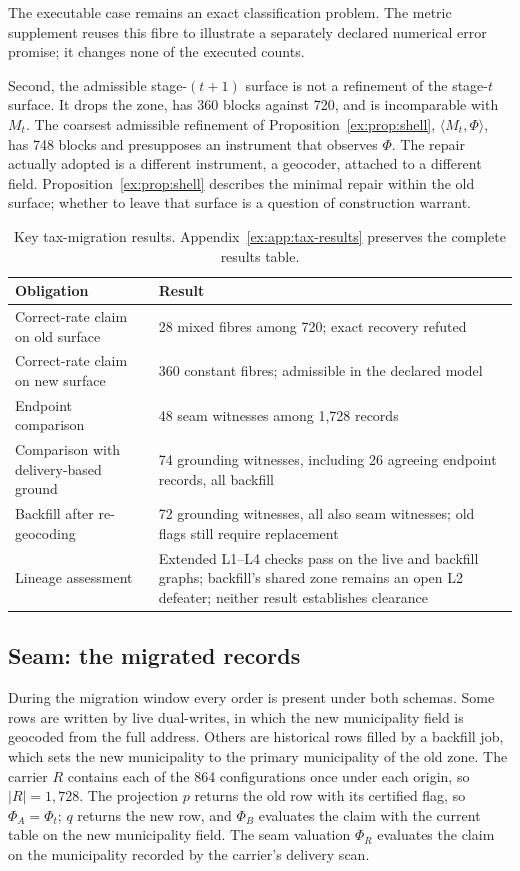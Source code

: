 \documentclass[11pt]{article}
\theoremstyle{definition}
\begin{document}
The executable case remains an exact classification problem. The metric supplement reuses this fibre to illustrate a separately declared numerical error promise; it changes none of the executed counts.

Second, the admissible stage-$(t+1)$ surface is not a refinement of the stage-$t$ surface. It drops the zone, has 360 blocks against 720, and is incomparable with $M_t$. The coarsest admissible refinement of Proposition~\ref{ex:prop:shell}, $\langle M_t,\Phi\rangle$, has 748 blocks and presupposes an instrument that observes $\Phi$. The repair actually adopted is a different instrument, a geocoder, attached to a different field. Proposition~\ref{ex:prop:shell} describes the minimal repair within the old surface; whether to leave that surface is a question of construction warrant.

\begin{table}[htbp]
\centering\small
\caption{Key tax-migration results. Appendix~\ref{ex:app:tax-results} preserves the complete results table.}
\label{ex:tab:case-results}
\begin{tabularx}{\textwidth}{@{}p{4.7cm}L@{}}
\toprule
Obligation & Result \\
\midrule
Correct-rate claim on old surface & 28 mixed fibres among 720; exact recovery refuted \\
Correct-rate claim on new surface & 360 constant fibres; admissible in the declared model \\
Endpoint comparison & 48 seam witnesses among 1,728 records \\
Comparison with delivery-based ground & 74 grounding witnesses, including 26 agreeing endpoint records, all backfill \\
Backfill after re-geocoding & 72 grounding witnesses, all also seam witnesses; old flags still require replacement \\
Lineage assessment & Extended L1--L4 checks pass on the live and backfill graphs; backfill's shared zone remains an open L2 defeater; neither result establishes clearance \\
\bottomrule
\end{tabularx}
\end{table}

\subsection{Seam: the migrated records}

During the migration window every order is present under both schemas. Some rows are written by live dual-writes, in which the new municipality field is geocoded from the full address. Others are historical rows filled by a backfill job, which sets the new municipality to the primary municipality of the old zone. The carrier $R$ contains each of the 864 configurations once under each origin, so $|R|=1{,}728$. The projection $p$ returns the old row with its certified flag, so $\Phi_A=\Phi_t$; $q$ returns the new row, and $\Phi_B$ evaluates the claim with the current table on the new municipality field. The seam valuation $\Phi_R$ evaluates the claim on the municipality recorded by the carrier's delivery scan.
\end{document}
